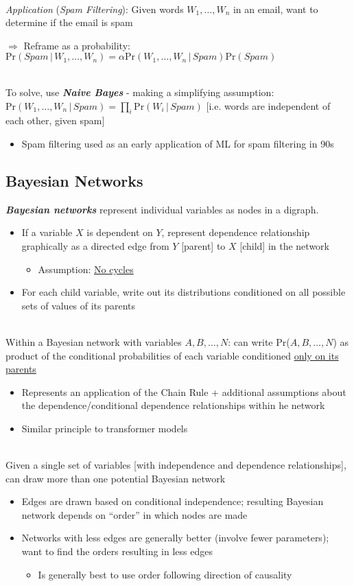 \documentclass[12pt]{extarticle}
\theoremstyle{definition}
\theoremstyle{remark}
\newcommand{\pstart}[0]{\noindent}
\newcommand{\newp}[0]{~\\ \pstart}
\newcommand{\term}[1]{\noindent\textbf{\textit{#1}}}
\newcommand{\prob}[1]{\text{Pr}(#1)}
\newcommand{\cond}[2]{#1\,\vert\,#2}
\begin{document}
\newp
\textit{Application} (\textit{Spam Filtering}): Given words $W_1,\hdots,W_n$ in an email, want to determine if the email is spam

\vspace{4pt}\pstart
$\Rightarrow$ Reframe as a probability: $\prob{\cond{Spam}{W_1,\hdots,W_n}}=\alpha\prob{\cond{W_1,\hdots,W_n}{Spam}}\prob{Spam}$

\newp
To solve, use \term{Naive Bayes} - making a simplifying assumption: $\prob{\cond{W_1,\hdots,W_n}{Spam}}=\prod_i\prob{\cond{W_i}{Spam}}$ [i.e. words are independent of each other, given spam]\begin{itemize}
    \item Spam filtering used as an early application of ML for spam filtering in 90s
\end{itemize}

\subsection{Bayesian Networks}
\pstart
\term{Bayesian networks} represent individual variables as nodes in a digraph. \begin{itemize}
    \item If a variable $X$ is dependent on $Y$, represent dependence relationship graphically as a directed edge from $Y$ [parent] to $X$ [child] in the network \begin{itemize}
        \item Assumption: \ul{No cycles}
    \end{itemize}
    \item For each child variable, write out its distributions conditioned on all possible sets of values of its parents
\end{itemize}

\newp
Within a Bayesian network with variables $A,B,\hdots,N$: can write Pr($A,B,\hdots,N$) as product of the conditional probabilities of each variable conditioned \ul{only on its parents} \begin{itemize}
    \item Represents an application of the Chain Rule + additional assumptions about the dependence/conditional dependence relationships within he network
    \item Similar principle to transformer models
\end{itemize}

\newp
Given a single set of variables [with independence and dependence relationships], can draw more than one potential Bayesian network \begin{itemize}
    \item Edges are drawn based on conditional independence; resulting Bayesian network depends on ``order'' in which nodes are made
    \item Networks with less edges are generally better (involve fewer parameters); want to find the orders resulting in less edges \begin{itemize}
        \item Is generally best to use order following direction of causality
    \end{itemize}
\end{itemize}
\end{document}
